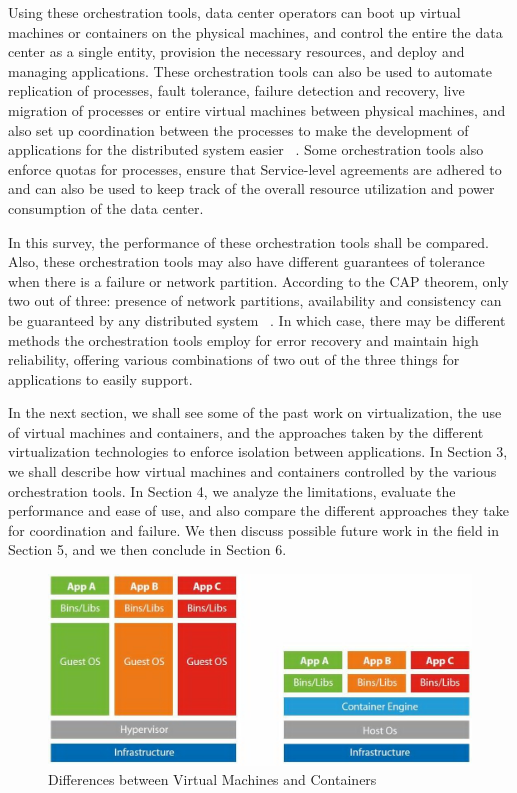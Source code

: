 \documentclass[10pt,twocolumn]{article}
\begin{document}
Using these orchestration tools, data center operators can boot up virtual machines or containers on the physical machines, and control the entire the data center as a single entity, provision the necessary resources, and deploy and managing applications.
These orchestration tools can also be used to automate replication of processes, fault tolerance, failure detection and recovery, live migration of processes or entire virtual machines between physical machines, and also set up coordination between the processes to make the development of applications for the distributed system easier ~\cite{live_migration, xen}.
Some orchestration tools also enforce quotas for processes, ensure that Service-level agreements are adhered to and can also be used to keep track of the overall resource utilization and power consumption of the data center.

In this survey, the performance of these orchestration tools shall be compared.
Also, these orchestration tools may also have different guarantees of tolerance when there is a failure or network partition.
According to the CAP theorem, only two out of three: presence of network partitions, availability and consistency can be guaranteed by any distributed system ~\cite{CAP_theorem}.
In which case, there may be different methods the orchestration tools employ for error recovery and maintain high reliability, offering various combinations of two out of the three things for applications to easily support.

In the next section, we shall see some of the past work on virtualization, the use of virtual machines and containers, and the approaches taken by the different virtualization technologies to enforce isolation between applications.
In Section 3, we shall describe how virtual machines and containers controlled by the various orchestration tools.
In Section 4, we analyze the limitations, evaluate the performance and ease of use, and also compare the different approaches they take for coordination and failure.
We then discuss possible future work in the field in Section 5, and we then conclude in Section 6.

\begin{figure}
\centering
  \includegraphics[width=\textwidth]{container-vs-vm.jpg}
    \caption{Differences between Virtual Machines and Containers~\cite{intro_containerisation}
      \label{overflow}}
\end{figure}
\end{document}
